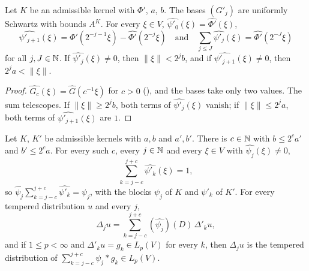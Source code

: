 \begin{lemma}
\label{lem:lp-kernel-blocks}
\leanok
{}
Let $K$ be an admissible kernel with $\Phi'$, $a$, $b$. The bases $(G'_j)$ are uniformly Schwartz
with bounds $A^K$. For every $\xi \in V$, $\widehat{\psi'_0}(\xi) = \widehat{\Phi'}(\xi)$,
\[
  \widehat{\psi'_{j+1}}(\xi) = \widehat{\Phi'}(2^{-j-1} \xi) - \widehat{\Phi'}(2^{-j} \xi)
  \quad \text{and} \quad
  \sum_{j \leq J} \widehat{\psi'_j}(\xi) = \widehat{\Phi'}(2^{-J} \xi)
\]
for all $j, J \in \mathbb{N}$. If $\widehat{\psi'_j}(\xi) \neq 0$, then $\|\xi\| < 2^j b$, and if
$\widehat{\psi'_{j+1}}(\xi) \neq 0$, then $2^j a < \|\xi\|$.
\end{lemma}

\begin{proof}
\leanok
$\widehat{G_c}(\xi) = \widehat G(c^{-1} \xi)$ for $c > 0$ (), and the
bases take only two values. The sum telescopes. If $\|\xi\| \geq 2^j b$, both terms of
$\widehat{\psi'_j}(\xi)$ vanish; if $\|\xi\| \leq 2^j a$, both terms of
$\widehat{\psi'_{j+1}}(\xi)$ are $1$.
\end{proof}

\begin{lemma}
\label{lem:lp-kernel-finite-identity}
\leanok
{}
Let $K$, $K'$ be admissible kernels with $a, b$ and $a', b'$. There is $c \in \mathbb{N}$ with
$b \leq 2^c a'$ and $b' \leq 2^c a$. For every such $c$, every $j \in \mathbb{N}$ and every $\xi \in V$
with $\widehat{\psi_j}(\xi) \neq 0$,
\[
  \sum_{k = j - c}^{j + c} \widehat{\psi'_k}(\xi) = 1 ,
\]
so $\widehat{\psi_j} \sum_{k = j - c}^{j + c} \widehat{\psi'_k} = \widehat{\psi_j}$, with the
blocks $\psi_j$ of $K$ and $\psi'_k$ of $K'$. For every tempered distribution $u$ and every $j$,
\[
  \Delta_j u = \sum_{k = j - c}^{j + c} (\widehat{\psi_j})(D) \, \Delta'_k u ,
\]
and if $1 \leq p < \infty$ and $\Delta'_k u = g_k \in L_p(V)$ for every $k$, then $\Delta_j u$ is
the tempered distribution of $\sum_{k = j - c}^{j + c} \psi_j * g_k \in L_p(V)$.
\end{lemma}

